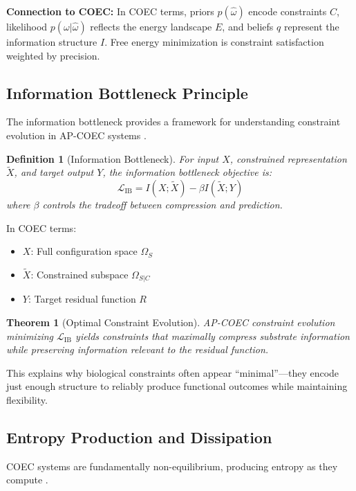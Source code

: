 \documentclass[11pt]{article}
\newtheorem{definition}{Definition}
\newtheorem{theorem}{Theorem}
\begin{document}
\textbf{Connection to COEC:} In COEC terms, priors $p(\hat{\omega})$ encode constraints $C$, likelihood $p(\omega|\hat{\omega})$ reflects the energy landscape $E$, and beliefs $q$ represent the information structure $I$. Free energy minimization is constraint satisfaction weighted by precision.

\subsection{Information Bottleneck Principle}

The information bottleneck provides a framework for understanding constraint evolution in AP-COEC systems \citep{tishby2000information}.

\begin{definition}[Information Bottleneck]
For input $X$, constrained representation $\tilde{X}$, and target output $Y$, the information bottleneck objective is:
\begin{equation}
\mathcal{L}_{\text{IB}} = I(X;\tilde{X}) - \beta I(\tilde{X};Y)
\end{equation}
where $\beta$ controls the tradeoff between compression and prediction.
\end{definition}

In COEC terms:
\begin{itemize}
\item $X$: Full configuration space $\Omega_S$
\item $\tilde{X}$: Constrained subspace $\Omega_{S|C}$
\item $Y$: Target residual function $R$
\end{itemize}

\begin{theorem}[Optimal Constraint Evolution]
AP-COEC constraint evolution minimizing $\mathcal{L}_{\text{IB}}$ yields constraints that maximally compress substrate information while preserving information relevant to the residual function.
\end{theorem}

This explains why biological constraints often appear ``minimal''—they encode just enough structure to reliably produce functional outcomes while maintaining flexibility.

\subsection{Entropy Production and Dissipation}

COEC systems are fundamentally non-equilibrium, producing entropy as they compute \citep{england2013statistical}.
\end{document}
